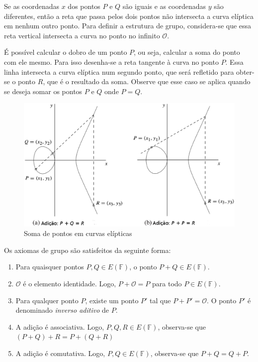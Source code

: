 Se as coordenadas \(x\) dos pontos \(P\) e \(Q\) são iguais e as coordenadas $y$ são diferentes, então a reta que passa pelos dois pontos não intersecta a curva elíptica em nenhum outro ponto. Para definir a estrutura de grupo, considera-se que essa reta vertical intersecta a curva no ponto no infinito $\mathcal{O}$. \cite{Stallings:2011}

É possível calcular o dobro de um ponto \(P\), ou seja, calcular a soma do ponto com ele mesmo. Para isso desenha-se a reta tangente à curva no ponto \(P\). Essa linha intersecta a curva elíptica num segundo ponto, que será refletido para obter-se o ponto \(R\), que é o resultado da soma. \cite{Guide} Observe que esse caso se aplica quando se deseja somar os pontos $P$ e $Q$ onde $P=Q$.

\begin{figure}[h]
\includegraphics[scale=0.5, bb=0 0 484 636]{figuras/SomaECC.eps}
\caption{Soma de pontos em curvas elípticas}
\label{fig:pontos}
\end{figure}

Os axiomas de grupo são satisfeitos da seguinte forma:
\begin{enumerate}
  \item Para quaisquer pontos $P, Q \in E(\mathbb{F})$, o ponto $P + Q \in E(\mathbb{F})$.
  \item $\mathcal{O}$ é o elemento identidade. Logo, $P + \mathcal{O} = P$ para todo $P \in E(\mathbb{F})$.
  \item Para qualquer ponto \(P\), existe um ponto $P'$ tal que $P + P' = \mathcal{O}$. O ponto $P'$ é denominado \textit{inverso aditivo} de \(P\).
  \item A adição é associativa. Logo, $P, Q, R \in E(\mathbb{F})$, observa-se que $(P + Q) + R = P + (Q + R)$
  \item A adição é comutativa. Logo, $P, Q \in E(\mathbb{F})$, observa-se que $P + Q = Q + P$.
\end{enumerate}

